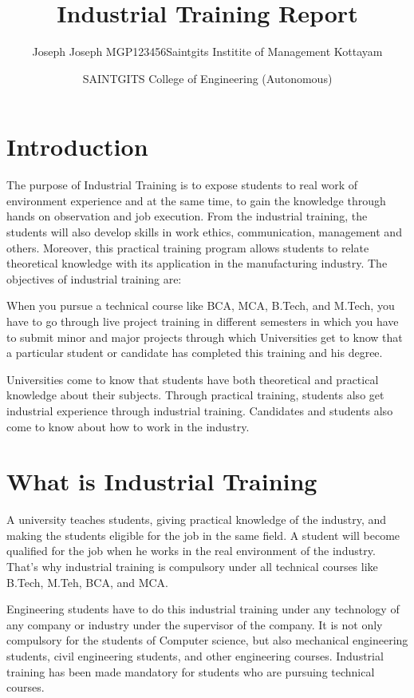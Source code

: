 \documentclass[12pt]{article}
\title{Industrial Training Report}
\author{Joseph Joseph \newline MGP123456\newline  Saintgits Institite of Management Kottayam}
\date{SAINTGITS College of Engineering (Autonomous)}
\begin{document}
\maketitle
\tableofcontents
\clearpage
\section{Introduction}
The purpose of Industrial Training is to expose students to real work of environment
experience and at the same time, to gain the knowledge through hands on observation and
job execution. From the industrial training, the students will also develop skills in work ethics,
communication, management and others. Moreover, this practical training program allows
students to relate theoretical knowledge with its application in the manufacturing industry.
The objectives of industrial training are:

When you pursue a technical course like BCA, MCA, B.Tech, and M.Tech, you have to go through live project training in different semesters in which you have to submit minor and major projects through which Universities get to know that a particular student or candidate has completed this training and his degree.

Universities come to know that students have both theoretical and practical knowledge about their subjects. Through practical training, students also get industrial experience through industrial training. Candidates and students also come to know about how to work in the industry.

\section{What is Industrial Training}
A university teaches students, giving practical knowledge of the industry, and making the students eligible for the job in the same field. A student will become qualified for the job when he works in the real environment of the industry. That’s why industrial training is compulsory under all technical courses like B.Tech, M.Teh, BCA, and MCA.

Engineering students have to do this industrial training under any technology of any company or industry under the supervisor of the company. It is not only compulsory for the students of Computer science, but also mechanical engineering students, civil engineering students, and other engineering courses. Industrial training has been made mandatory for students who are pursuing technical courses.
\end{document}
